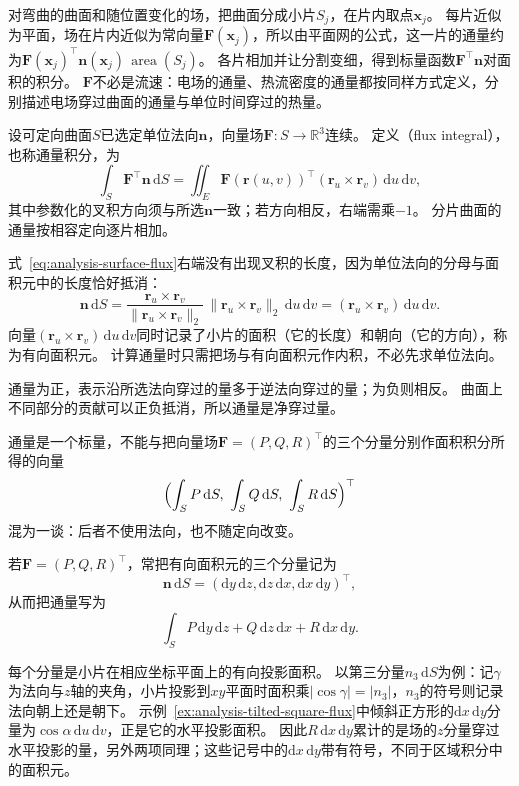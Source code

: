 对弯曲的曲面和随位置变化的场，把曲面分成小片$S_j$，在片内取点$\bm x_j$。
每片近似为平面，场在片内近似为常向量$\bm F(\bm x_j)$，所以由平面网的公式，这一片的通量约为$\bm F(\bm x_j)^\top\bm n(\bm x_j)\,\operatorname{area}(S_j)$。
各片相加并让分割变细，得到标量函数$\bm F^\top\bm n$对面积的积分。
$\bm F$不必是流速：电场的通量、热流密度的通量都按同样方式定义，分别描述电场穿过曲面的通量与单位时间穿过的热量。

\begin{definition}[第二类曲面积分]
\label{def:analysis-surface-flux-integral}
设可定向曲面$S$已选定单位法向$\bm n$，向量场$\bm F:S\to\mathbb R^3$连续。
定义（flux integral），也称通量积分，为
\begin{equation}
 \int_S\bm F^\top\bm n\,\mathrm dS
 =\iint_E\bm F(\bm r(u,v))^\top(\bm r_u\times\bm r_v)\,\mathrm du\,\mathrm dv,
 \label{eq:analysis-surface-flux}
\end{equation}
其中参数化的叉积方向须与所选$\bm n$一致；若方向相反，右端需乘$-1$。
分片曲面的通量按相容定向逐片相加。
\end{definition}

式~\eqref{eq:analysis-surface-flux}右端没有出现叉积的长度，因为单位法向的分母与面积元中的长度恰好抵消：
\[
 \bm n\,\mathrm dS
 =\frac{\bm r_u\times\bm r_v}{\lVert\bm r_u\times\bm r_v\rVert_2}\,\lVert\bm r_u\times\bm r_v\rVert_2\,\mathrm du\,\mathrm dv
 =(\bm r_u\times\bm r_v)\,\mathrm du\,\mathrm dv.
\]
向量$(\bm r_u\times\bm r_v)\,\mathrm du\,\mathrm dv$同时记录了小片的面积（它的长度）和朝向（它的方向），称为有向面积元。
计算通量时只需把场与有向面积元作内积，不必先求单位法向。

通量为正，表示沿所选法向穿过的量多于逆法向穿过的量；为负则相反。
曲面上不同部分的贡献可以正负抵消，所以通量是净穿过量。

通量是一个标量，不能与把向量场$\bm F=(P,Q,R)^\top$的三个分量分别作面积积分所得的向量
\[
 \Bigl(\int_SP\,\mathrm dS,\ \int_SQ\,\mathrm dS,\ \int_SR\,\mathrm dS\Bigr)^\top
\]
混为一谈：后者不使用法向，也不随定向改变。

若$\bm F=(P,Q,R)^\top$，常把有向面积元的三个分量记为
\[
 \bm n\,\mathrm dS=(\mathrm dy\,\mathrm dz,\mathrm dz\,\mathrm dx,\mathrm dx\,\mathrm dy)^\top,
\]
从而把通量写为
\[
 \int_SP\,\mathrm dy\,\mathrm dz+Q\,\mathrm dz\,\mathrm dx+R\,\mathrm dx\,\mathrm dy.
\]

每个分量是小片在相应坐标平面上的有向投影面积。
以第三分量$n_3\,\mathrm dS$为例：记$\gamma$为法向与$z$轴的夹角，小片投影到$xy$平面时面积乘$|\cos\gamma|=|n_3|$，$n_3$的符号则记录法向朝上还是朝下。
示例~\ref{ex:analysis-tilted-square-flux}中倾斜正方形的$\mathrm dx\,\mathrm dy$分量为$\cos\alpha\,\mathrm du\,\mathrm dv$，正是它的水平投影面积。
因此$R\,\mathrm dx\,\mathrm dy$累计的是场的$z$分量穿过水平投影的量，另外两项同理；这些记号中的$\mathrm dx\,\mathrm dy$带有符号，不同于区域积分中的面积元。

